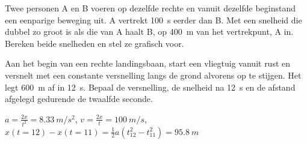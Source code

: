 \documentclass{ximera}
\begin{document}
\begin{exercise}
    Twee personen A en B voeren op dezelfde rechte en vanuit dezelfde beginstand een eenparige beweging uit. A vertrekt \SI{100}{s} eerder dan B. Met een snelheid die dubbel zo groot is als die van A haalt B, op \SI{400}{m} van het vertrekpunt, A in. Bereken beide snelheden en stel ze grafisch voor.
\end{exercise}

\begin{exercise}
    Aan het begin van een rechte landingsbaan, start een vliegtuig vanuit rust en versnelt met een constante versnelling langs de grond alvorens op te stijgen. Het legt \SI{600}{m} af in \SI{12}{s}. Bepaal de versnelling, de snelheid na \SI{12}{s} en de afstand afgelegd gedurende de twaalfde seconde.

    \begin{oplossing}
        $a=\frac{2x}{t^2}=\SI{8,33}{m/s^2}$,
        $v=\frac{2x}{t}=\SI{100}{m/s}$,
        $x(t=12)-x(t=11)=\frac{1}{2}a(t_{12}^2-t_{11}^2)=\SI{95,8}{m}$
    \end{oplossing}
\end{exercise}
\end{document}
